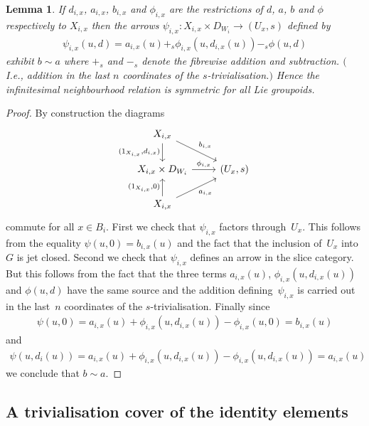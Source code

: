 \documentclass[pdftex]{sigma}
\numberwithin{equation}{section}
\newtheorem{Lemma}[Theorem]{Lemma}
\begin{document}
\begin{Lemma}\label{lem:approx-is-symmetric} If $d_{i,x}$, $a_{i,x}$, $b_{i,x}$ and $\phi_{i,x}$ are the restrictions of $d$, $a$, $b$ and $\phi$ respectively to $X_{i,x}$ then the arrows $\psi_{i,x}\colon X_{i,x}\times D_{W_i}\rightarrow (U_{x},s)$ defined by
\begin{gather*}\psi_{i,x}(u,d)=a_{i,x}(u)+_{s}\phi_{i,x}(u,d_{i,x}(u))-_{s}\phi(u,d)\end{gather*}
exhibit $b\sim a$ where $+_{s}$ and $-_{s}$ denote the fibrewise addition and subtraction. $($I.e., addition in the last $n$ coordinates of the $s$-trivialisation.$)$ Hence the infinitesimal neighbourhood relation is symmetric for all Lie groupoids.
\end{Lemma}
\begin{proof}
By construction the diagrams
\begin{equation*}
\begin{tikzcd}
 X_{i,x}\dar[swap]{(1_{X_{i,x}},d_{i,x})} \drar{b_{i,x}} {}\\
 X_{i,x} \times D_{W_i} \rar{\phi_{i,x}} & (U_{x},s)\\
 X_{i,x}\uar{(1_{X_{i,x}},0)} \urar[swap]{a_{i,x}} & {}
\end{tikzcd}
\end{equation*}
commute for all $x\in B_i$. First we check that $\psi_{i,x}$ factors through~$U_x$. This follows from the equality $\psi(u,0)=b_{i,x}(u)$ and the fact that the inclusion of~$U_x$ into~$G$ is jet closed. Second we check that $\psi_{i,x}$ def\/ines an arrow in the slice category. But this follows from the fact that the three terms $a_{i,x}(u)$, $\phi_{i,x}(u,d_{i,x}(u))$ and $\phi(u,d)$ have the same source and the addition def\/i\-ning~$\psi_{i,x}$ is carried out in the last~$n$ coordinates of the $s$-trivialisation. Finally since
\begin{gather*}\psi(u,0)=a_{i,x}(u)+\phi_{i,x}(u,d_{i,x}(u))-\phi_{i,x}(u,0)=b_{i,x}(u)\end{gather*}
and
\begin{gather*}\psi(u,d_i(u))=a_{i,x}(u)+\phi_{i,x}(u,d_{i,x}(u))-\phi_{i,x}(u,d_{i,x}(u))=a_{i,x}(u)\end{gather*}
we conclude that $b\sim a$.
\end{proof}

\subsection{A trivialisation cover of the identity elements}\label{sec:trivialisation-of-identities}
\end{document}
